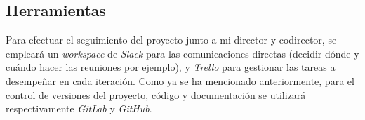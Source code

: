 \subsection{Herramientas}

Para efectuar el seguimiento del proyecto junto a mi director y codirector, se empleará un \textit{workspace} de \textit{Slack} para las comunicaciones directas (decidir dónde y cuándo hacer las reuniones por ejemplo), y \textit{Trello} para gestionar las tareas a desempeñar en cada iteración. Como ya se ha mencionado anteriormente, para el control de versiones del proyecto, código y documentación se utilizará respectivamente \textit{GitLab} y \textit{GitHub}.